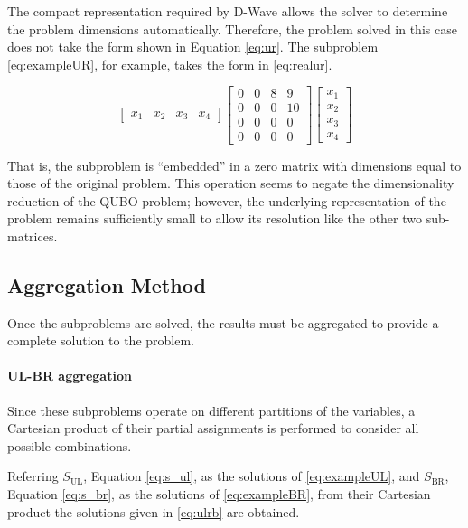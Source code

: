 The compact representation required by D-Wave allows the solver to determine the problem dimensions automatically. 
Therefore, the problem solved in this case does not take the form shown in Equation \eqref{eq:ur}.
The subproblem \eqref{eq:exampleUR}, for example, takes the form in \eqref{eq:realur}.

\begin{equation}
    \begin{bmatrix}
        x_1 & x_2 & x_3 & x_4
    \end{bmatrix}
    \begin{bmatrix}
        0 & 0 & 8 & 9 \\
        0 & 0 & 0 & 10 \\
        0 & 0 & 0 & 0 \\
        0 & 0 & 0 & 0 
    \end{bmatrix}
    \begin{bmatrix}
        x_1 \\
        x_2 \\
        x_3 \\
        x_4 
    \end{bmatrix}
    \label{eq:realur}
\end{equation}

That is, the subproblem is ``embedded'' in a zero matrix with dimensions equal to those of the original problem. 
This operation seems to negate the dimensionality reduction of the QUBO problem; however, the underlying representation of the problem remains sufficiently small to allow its resolution like the other two sub-matrices.

\subsection{Aggregation Method}\label{sec:aggr}

Once the subproblems are solved, the results must be aggregated to provide a complete solution to the problem.

\paragraph{UL-BR aggregation} Since these subproblems operate on different partitions of the variables, a Cartesian product of their partial assignments is performed to consider all possible combinations. 

Referring $S_{\operatorname{UL}}$, Equation \eqref{eq:s_ul}, as the solutions of \eqref{eq:exampleUL}, and $S_{\operatorname{BR}}$, Equation \eqref{eq:s_br}, as the solutions of \eqref{eq:exampleBR}, from their Cartesian product the solutions given in \eqref{eq:ulrb} are obtained.

